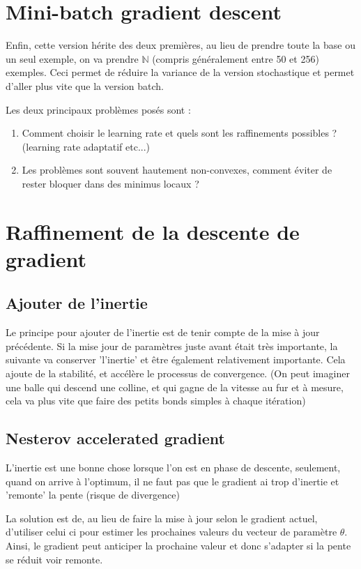 \documentclass[a4paper]{article}
\begin{document}
\section{Mini-batch gradient descent}

Enfin, cette version hérite des deux premières, au lieu de prendre toute la base ou un seul exemple, on va prendre $\mathbb{N}$ (compris généralement entre 50 et 256) exemples.
Ceci permet de réduire la variance de la version stochastique et permet d'aller plus vite que la version batch.


Les deux principaux problèmes posés sont :
\begin{enumerate}
\item Comment choisir le learning rate et quels sont les raffinements possibles ? (learning rate adaptatif etc...)
\item Les problèmes sont souvent hautement non-convexes, comment éviter de rester bloquer dans des minimus locaux ?
\end{enumerate}


\section{Raffinement de la descente de gradient}

\subsection{Ajouter de l'inertie}

Le principe pour ajouter de l'inertie est de tenir compte de la mise à jour précédente. Si la mise jour de paramètres juste avant était très importante, la suivante va conserver 'l'inertie' et être également relativement importante. Cela ajoute de la stabilité, et accélère le processus de convergence.
(On peut imaginer une balle qui descend une colline, et qui gagne de la vitesse au fur et à mesure, cela va plus vite que faire des petits bonds simples à chaque itération)

\subsection{Nesterov accelerated gradient}

L'inertie est une bonne chose lorsque l'on est en phase de descente, seulement, quand on arrive à l'optimum, il ne faut pas que le gradient ai trop d'inertie et 'remonte' la pente (risque de divergence)

La solution est de, au lieu de faire la mise à jour selon le gradient actuel, d'utiliser celui ci pour estimer les prochaines valeurs du vecteur de paramètre $\theta$. Ainsi, le gradient peut anticiper la prochaine valeur et donc s'adapter si la pente se réduit voir remonte.
\end{document}
